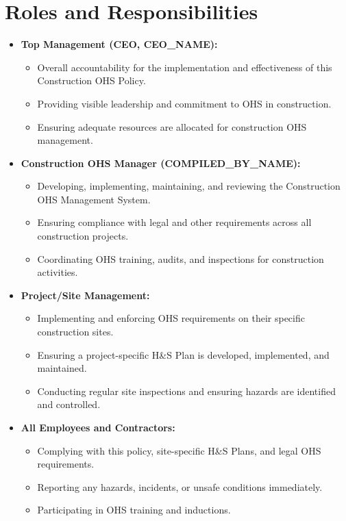 \documentclass[12pt]{article}
\begin{document}
\section{Roles and Responsibilities}
\begin{itemize}
    \item \textbf{Top Management (CEO, {{CEO_NAME}}):}
    \begin{itemize}
        \item Overall accountability for the implementation and effectiveness of this Construction OHS Policy.
        \item Providing visible leadership and commitment to OHS in construction.
        \item Ensuring adequate resources are allocated for construction OHS management.
    \end{itemize}
    \item \textbf{Construction OHS Manager ({{COMPILED_BY_NAME}}):}
    \begin{itemize}
        \item Developing, implementing, maintaining, and reviewing the Construction OHS Management System.
        \item Ensuring compliance with legal and other requirements across all construction projects.
        \item Coordinating OHS training, audits, and inspections for construction activities.
    \end{itemize}
    \item \textbf{Project/Site Management:}
    \begin{itemize}
        \item Implementing and enforcing OHS requirements on their specific construction sites.
        \item Ensuring a project-specific H\&S Plan is developed, implemented, and maintained.
        \item Conducting regular site inspections and ensuring hazards are identified and controlled.
    \end{itemize}
    \item \textbf{All Employees and Contractors:}
    \begin{itemize}
        \item Complying with this policy, site-specific H\&S Plans, and legal OHS requirements.
        \item Reporting any hazards, incidents, or unsafe conditions immediately.
        \item Participating in OHS training and inductions.
    \end{itemize}
\end{itemize}
\end{document}
